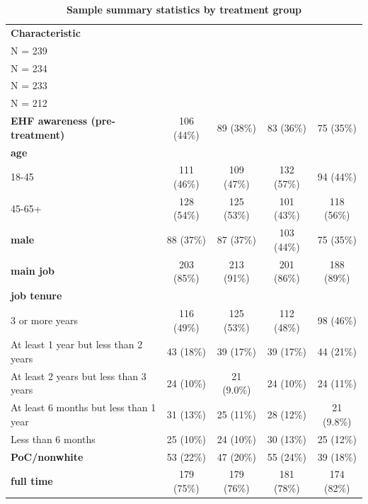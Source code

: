 \documentclass[
  11pt,
  oneside]{article}
\begin{document}
\begin{table}

\caption{\label{tab:tab-sum-wmt}\textbf{Sample summary statistics by treatment group}}
\centering
\begin{tabular}[t]{l|c|c|c|c}
\hline
\textbf{Characteristic} & \makecell[c]{\textbf{ctrl}\ \ \\N = 239} & \makecell[c]{\textbf{vid0}\ \ \\N = 234} & \makecell[c]{\textbf{vidChar}\ \ \\N = 233} & \makecell[c]{\textbf{vidSolid}\ \ \\N = 212}\\
\hline
\textbf{EHF awareness (pre-treatment)} & 106 (44\%) & 89 (38\%) & 83 (36\%) & 75 (35\%)\\
\hline
\textbf{age} &  &  &  & \\
\hline
\hspace{1em}18-45 & 111 (46\%) & 109 (47\%) & 132 (57\%) & 94 (44\%)\\
\hline
\hspace{1em}45-65+ & 128 (54\%) & 125 (53\%) & 101 (43\%) & 118 (56\%)\\
\hline
\textbf{male} & 88 (37\%) & 87 (37\%) & 103 (44\%) & 75 (35\%)\\
\hline
\textbf{main job} & 203 (85\%) & 213 (91\%) & 201 (86\%) & 188 (89\%)\\
\hline
\textbf{job tenure} &  &  &  & \\
\hline
\hspace{1em}3 or more years & 116 (49\%) & 125 (53\%) & 112 (48\%) & 98 (46\%)\\
\hline
\hspace{1em}At least 1 year but less than 2 years & 43 (18\%) & 39 (17\%) & 39 (17\%) & 44 (21\%)\\
\hline
\hspace{1em}At least 2 years but less than 3 years & 24 (10\%) & 21 (9.0\%) & 24 (10\%) & 24 (11\%)\\
\hline
\hspace{1em}At least 6 months but less than 1 year & 31 (13\%) & 25 (11\%) & 28 (12\%) & 21 (9.8\%)\\
\hline
\hspace{1em}Less than 6 months & 25 (10\%) & 24 (10\%) & 30 (13\%) & 25 (12\%)\\
\hline
\textbf{PoC/nonwhite} & 53 (22\%) & 47 (20\%) & 55 (24\%) & 39 (18\%)\\
\hline
\textbf{full time} & 179 (75\%) & 179 (76\%) & 181 (78\%) & 174 (82\%)\\

\end{tabular}
\end{table}
\end{document}
